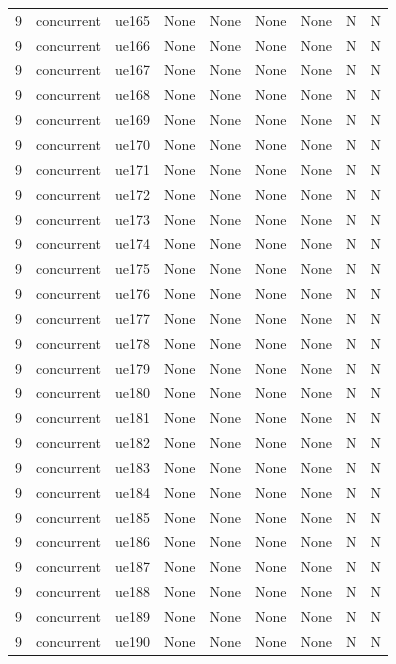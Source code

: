 \begin{table}[ht]
\begin{tabular}{|c|c|c|c|c|c|c|c|c|}
9 & concurrent & ue165 & None & None & None & None & N & N \\
9 & concurrent & ue166 & None & None & None & None & N & N \\
9 & concurrent & ue167 & None & None & None & None & N & N \\
9 & concurrent & ue168 & None & None & None & None & N & N \\
9 & concurrent & ue169 & None & None & None & None & N & N \\
9 & concurrent & ue170 & None & None & None & None & N & N \\
9 & concurrent & ue171 & None & None & None & None & N & N \\
9 & concurrent & ue172 & None & None & None & None & N & N \\
9 & concurrent & ue173 & None & None & None & None & N & N \\
9 & concurrent & ue174 & None & None & None & None & N & N \\
9 & concurrent & ue175 & None & None & None & None & N & N \\
9 & concurrent & ue176 & None & None & None & None & N & N \\
9 & concurrent & ue177 & None & None & None & None & N & N \\
9 & concurrent & ue178 & None & None & None & None & N & N \\
9 & concurrent & ue179 & None & None & None & None & N & N \\
9 & concurrent & ue180 & None & None & None & None & N & N \\
9 & concurrent & ue181 & None & None & None & None & N & N \\
9 & concurrent & ue182 & None & None & None & None & N & N \\
9 & concurrent & ue183 & None & None & None & None & N & N \\
9 & concurrent & ue184 & None & None & None & None & N & N \\
9 & concurrent & ue185 & None & None & None & None & N & N \\
9 & concurrent & ue186 & None & None & None & None & N & N \\
9 & concurrent & ue187 & None & None & None & None & N & N \\
9 & concurrent & ue188 & None & None & None & None & N & N \\
9 & concurrent & ue189 & None & None & None & None & N & N \\
9 & concurrent & ue190 & None & None & None & None & N & N \\

\end{tabular}
\end{table}
